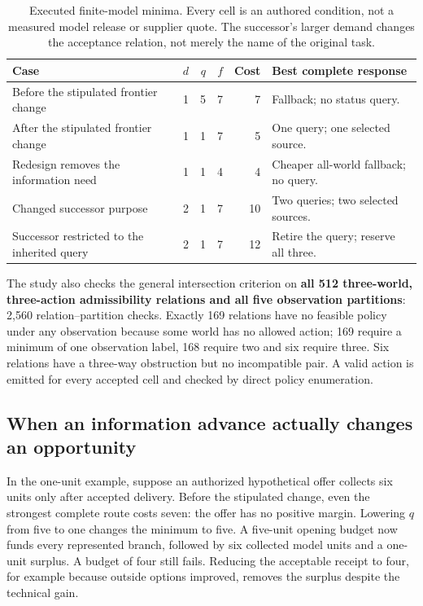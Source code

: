 \begin{table}[H]
\centering\small
\begin{tabularx}{\linewidth}{YrrrrY}
\toprule
\textbf{Case} & $d$ & $q$ & $f$ & \textbf{Cost} & \textbf{Best complete response}\\
\midrule
Before the stipulated frontier change & 1 & 5 & 7 & 7 & Fallback; no status query.\\
After the stipulated frontier change & 1 & 1 & 7 & 5 & One query; one selected source.\\
Redesign removes the information need & 1 & 1 & 4 & 4 & Cheaper all-world fallback; no query.\\
Changed successor purpose & 2 & 1 & 7 & 10 & Two queries; two selected sources.\\
Successor restricted to the inherited query & 2 & 1 & 7 & 12 & Retire the query; reserve all three.\\
\bottomrule
\end{tabularx}
\caption{Executed finite-model minima. Every cell is an authored condition, not a measured model release or supplier quote. The successor's larger demand changes the acceptance relation, not merely the name of the original task.}
\label{tab:decision}
\end{table}

The study also checks the general intersection criterion on \textbf{all 512 three-world, three-action admissibility relations and all five observation partitions}: 2,560 relation--partition checks. Exactly 169 relations have no feasible policy under any observation because some world has no allowed action; 169 require a minimum of one observation label, 168 require two and six require three. Six relations have a three-way obstruction but no incompatible pair. A valid action is emitted for every accepted cell and checked by direct policy enumeration.

\subsection{When an information advance actually changes an opportunity}
In the one-unit example, suppose an authorized hypothetical offer collects six units only after accepted delivery. Before the stipulated change, even the strongest complete route costs seven: the offer has no positive margin. Lowering $q$ from five to one changes the minimum to five. A five-unit opening budget now funds every represented branch, followed by six collected model units and a one-unit surplus. A budget of four still fails. Reducing the acceptable receipt to four, for example because outside options improved, removes the surplus despite the technical gain.

